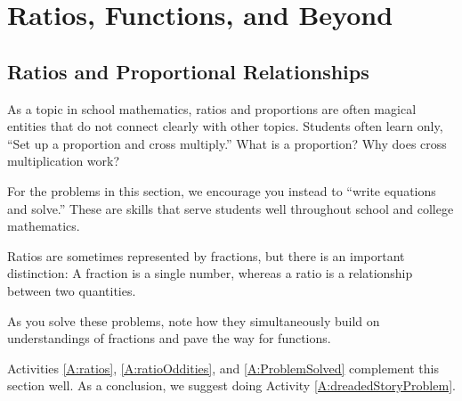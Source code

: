 \chapter{Ratios, Functions, and Beyond}

\section{Ratios and Proportional Relationships}
As a topic in school mathematics, ratios and proportions are often magical entities that do not connect clearly with other topics.  Students often learn only, ``Set up a proportion and cross multiply.''   What is a proportion?  Why does cross multiplication work?  

For the problems in this section, we encourage you instead to ``write equations and solve.''  These are skills that serve students well throughout school and college mathematics.  

Ratios are sometimes represented by fractions, but there is an important distinction:  A fraction is a single number, whereas a ratio
is a relationship between two quantities.  

As you solve these problems, note how they simultaneously build on understandings of fractions and pave the way for functions.  



\begin{activitynote}
Activities \ref{A:ratios},  \ref{A:ratioOddities}, and \ref{A:ProblemSolved} complement this section well. 
As a conclusion, we suggest doing Activity \ref{A:dreadedStoryProblem}.
\end{activitynote}

\newpage

